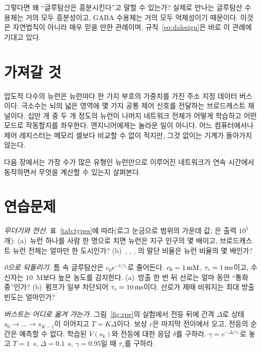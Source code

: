 그렇다면 왜 “글루탐산은 흥분시킨다”고 말할 수 있는가? 실제로 만나는 글루탐산 수용체는 거의 모두 흥분성이고, GABA 수용체는 거의 모두 억제성이기 때문이다. 이것은 자연법칙이 아니라 매우 믿을 만한 관례이며, 규칙~\eqref{eq:dalesign}은 바로 이 관례에 기대고 있다.

\section{가져갈 것}

압도적 다수의 뉴런은 뉴런마다 한 가지 부호의 가중치를 가진 주소 지정 데이터 버스이다. 극소수는 뇌의 넓은 영역에 몇 가지 공통 제어 신호를 전달하는 브로드캐스트 채널이다. 십만 개 중 두 개 정도의 뉴런이 나머지 네트워크 전체가 어떻게 학습하고 어떤 모드로 작동할지를 좌우한다. 엔지니어에게는 놀라운 일이 아니다. 어느 컴퓨터에서나 제어 레지스터는 메모리 셀보다 비교할 수 없이 적지만, 그것 없이는 기계가 돌아가지 않는다.

다음 장에서는 가장 수가 많은 유형인  뉴런만으로 이루어진 네트워크가 연속 시간에서 동작하면서 무엇을 계산할 수 있는지 살펴본다.

\section{연습문제}

\begin{exercise}[\lvlA]
\label{ex:01:1}
\emph{무더기와 전선.} 표~\ref{tab:types}에 따라(로그 눈금으로 범위의 가운데 값; 은 출력 $10^5$개): (a)~뉴런 하나를 사람 한 명으로 치면  뉴런은 지구 인구의 몇 배이고, 브로드캐스트 뉴런 전체는 얼마만 한 도시인가? (b)~, , , 의 말단 비율은 뉴런 비율의 몇 배인가?
\end{exercise}

\begin{exercise}[\lvlA]
\label{ex:01:2}
\emph{0으로 되돌리기.} 틈 속 글루탐산은 $c_0e^{-t/\tau_c}$로 줄어든다. $c_0=1\,\text{mM}$, $\tau_c=1\,\text{ms}$이고, 수신자는 $10$~\textmu M보다 높은 농도를 감지한다. (a)~방출 한 번 뒤 선로는 얼마 동안 “통화 중”인가? (b)~펌프가 일부 차단되어 $\tau_c=10\,\text{ms}$이다. 선로가 제때 비워지는 최대 방출 빈도는 얼마인가?
\end{exercise}

\begin{exercise}[\lvlB]
\label{ex:01:3}
\emph{버스트는 어디로 옮겨 가는가.} 그림~\ref{fig:rpe}의 실험에서 전등 뒤에 간격 $\Delta$로 상태 $s_0\to\dots\to s_{K-1}$이 이어지고 $T=K\Delta$이다. 보상 $r$은 마지막 전이에서 오고, 전등의 순간은 예측할 수 없다. 학습된 $V(s_k)$와 전등에 대한 응답 $\delta$를 구하라. $\gamma=e^{-\Delta/\tau_\gamma}$로 놓고 $T=1$~s, $\Delta=0.1$~s, $\gamma=0.95$일 때 $\tau_\gamma$를 구하라.
\end{exercise}

